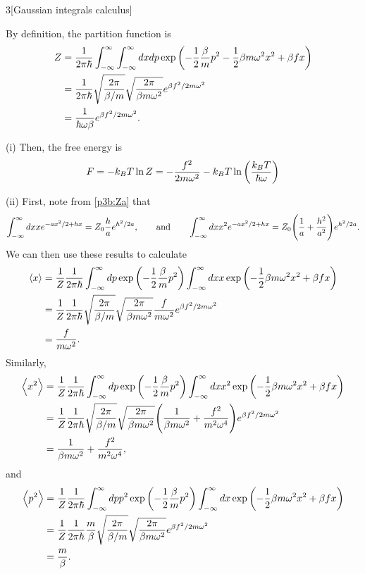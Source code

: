 \documentclass[12pt]{article}
\begin{document}
\begin{problem}{3}[Gaussian integrals calculus]
\begin{solution}
By definition, the partition function is
\begin{align}
    Z
    &=\frac1{2\pi\hbar}\int_{-\infty}^\infty\int_{-\infty}^\infty dx dp
    \exp\qty(-\frac12\frac{\beta}{m}p^2-\frac12\beta m\omega^2x^2+\beta
    fx)\notag\\
    &=\frac1{2\pi\hbar}\sqrt{\frac{2\pi}{\beta/m}}\sqrt{\frac{2\pi}{\beta
    m\omega^2}}e^{\beta f^2/2m\omega^2}\notag\\
    &=\frac1{\hbar\omega\beta}e^{\beta f^2/2m\omega^2}.
\end{align}

(i) Then, the free energy is
\begin{equation}
    F=-k_BT\ln Z=-\frac{f^2}{2m\omega^2}-k_BT\ln\qty(\frac{k_BT}{\hbar\omega}) 
\end{equation}

(ii) First, note from \eqref{p3b:Za} that
\begin{equation}
    \int_{-\infty}^\infty dx xe^{-ax^2/2+hx}
    =Z_0\frac{h}{a}e^{h^2/2a},
    \qquad
    \text{and}
    \qquad
     \int_{-\infty}^\infty dx x^2e^{-ax^2/2+hx}
    =Z_0\qty(\frac1a+\frac{h^2}{a^2})e^{h^2/2a}.
\end{equation}
We can then use these results to calculate
\begin{align}
    \expval{x}
    &=\frac1Z\frac1{2\pi\hbar}\int_{-\infty}^\infty
    dp\exp\qty(-\frac12\frac\beta{m}p^2)
    \int_{-\infty}^\infty dx x\exp\qty(-\frac12\beta m\omega^2x^2+\beta
    fx)\notag\\
    &=\frac1Z\frac{1}{2\pi\hbar}\sqrt{\frac{2\pi}{\beta/m}}
    \sqrt{\frac{2\pi}{\beta m\omega^2}}\frac{f}{m\omega^2}e^{\beta
    f^2/2m\omega^2}\notag\\
    &=\frac{f}{m\omega^2}.
\end{align}
Similarly, 
\begin{align}
    \expval{x^2}
    &=\frac1Z\frac1{2\pi\hbar}
    \int_{-\infty}^\infty dp\exp\qty(-\frac12\frac\beta{m}p^2)
    \int_{-\infty}^\infty dx x^2\exp\qty(-\frac12\beta m\omega^2x^2+\beta
    fx)\notag\\
    &=
    \frac1Z\frac1{2\pi\hbar}\sqrt{\frac{2\pi}{\beta/m}}
    \sqrt{\frac{2\pi}{\beta m\omega ^2}}\qty(\frac1{\beta
    m\omega^2}+\frac{f^2}{m^2\omega^4})e^{\beta
f^2/2m\omega^2}\notag\\
    &=\frac1{\beta m\omega^2}+\frac{f^2}{m^2\omega^4},
\end{align}
and
\begin{align}
     \expval{p^2}
    &=\frac1Z\frac1{2\pi\hbar}
    \int_{-\infty}^\infty dpp^2\exp\qty(-\frac12\frac\beta{m}p^2)
    \int_{-\infty}^\infty dx \exp\qty(-\frac12\beta m\omega^2x^2+\beta
    fx)\notag\\
    &=\frac1Z\frac1{2\pi\hbar}\frac{m}{\beta}\sqrt{\frac{2\pi}{\beta/m}}
    \sqrt{\frac{2\pi}{\beta m\omega^2}}e^{\beta f^2/2m\omega^2}\notag\\
    &=\frac{m}{\beta}.
\end{align}


\end{solution}
\end{problem}
\end{document}
